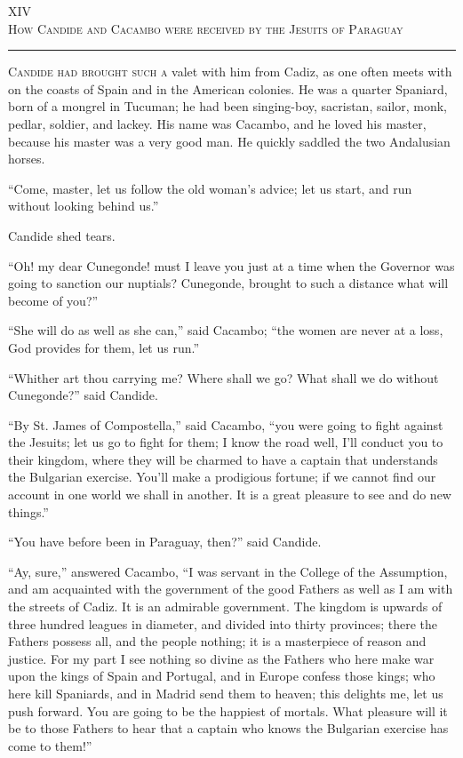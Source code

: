 \begin{center}
XIV\\
\textsc{How Candide and Cacambo were received by the Jesuits of Paraguay}
\end{center}
\vspace{-0.5cm}
\rule{\textwidth}{0.5pt}
\lettrine{C}{andide had brought such a} valet with him from Cadiz, as one often meets with on the coasts of Spain and in the American colonies. He was a quarter Spaniard, born of a mongrel in Tucuman; he had been singing-boy, sacristan, sailor, monk, pedlar, soldier, and lackey. His name was Cacambo, and he loved his master, because his master was a very good man. He quickly saddled the two Andalusian horses.

``Come, master, let us follow the old woman's advice; let us start, and run without looking behind us.''

Candide shed tears.

``Oh! my dear Cunegonde! must I leave you just at a time when the Governor was going to sanction our nuptials? Cunegonde, brought to such a distance what will become of you?''

``She will do as well as she can,'' said Cacambo; ``the women are never at a loss, God provides for them, let us run.''

``Whither art thou carrying me? Where shall we go? What shall we do without Cunegonde?'' said Candide.

``By St. James of Compostella,'' said Cacambo, ``you were going to fight against the Jesuits; let us go to fight for them; I know the road well, I'll conduct you to their kingdom, where they will be charmed to have a captain that understands the Bulgarian exercise. You'll make a prodigious fortune; if we cannot find our account in one world we shall in another. It is a great pleasure to see and do new things.''

``You have before been in Paraguay, then?'' said Candide.

``Ay, sure,'' answered Cacambo, ``I was servant in the College of the Assumption, and am acquainted with the government of the good Fathers as well as I am with the streets of Cadiz. It is an admirable government. The kingdom is upwards of three hundred leagues in diameter, and divided into thirty provinces; there the Fathers possess all, and the people nothing; it is a masterpiece of reason and justice. For my part I see nothing so divine as the Fathers who here make war upon the kings of Spain and Portugal, and in Europe confess those kings; who here kill Spaniards, and in Madrid send them to heaven; this delights me, let us push forward. You are going to be the happiest of mortals. What pleasure will it be to those Fathers to hear that a captain who knows the Bulgarian exercise has come to them!''

